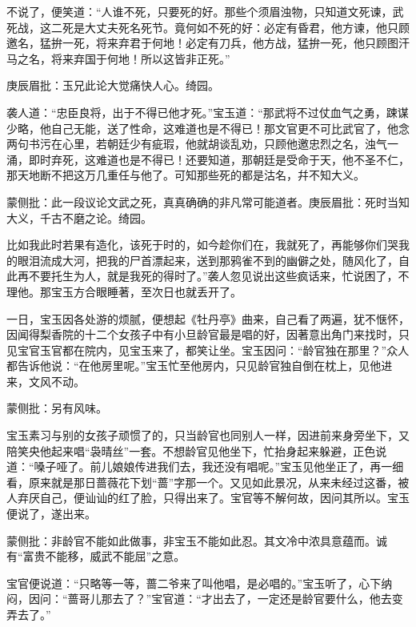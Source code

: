 \begin{parag}
不说了，便笑道：“人谁不死，只要死的好。那些个须眉浊物，只知道文死谏，武死战，这二死是大丈夫死名死节。竟何如不死的好：必定有昏君，他方谏，他只顾邀名，猛拚一死，将来弃君于何地！必定有刀兵，他方战，猛拚一死，他只顾图汗马之名，将来弃国于何地！所以这皆非正死。”\begin{note}庚辰眉批：玉兄此论大觉痛快人心。绮园。\end{note}袭人道：“忠臣良将，出于不得已他才死。”宝玉道：“那武将不过仗血气之勇，踈谋少略，他自己无能，送了性命，这难道也是不得已！那文官更不可比武官了，他念两句书污在心里，若朝廷少有疵瑕，他就胡谈乱劝，只顾他邀忠烈之名，浊气一涌，即时弃死，这难道也是不得已！还要知道，那朝廷是受命于天，他不圣不仁，那天地断不把这万几重任与他了。可知那些死的都是沽名，幷不知大义。\begin{note}蒙侧批：此一段议论文武之死，真真确确的非凡常可能道者。庚辰眉批：死时当知大义，千古不磨之论。绮园。\end{note}比如我此时若果有造化，该死于时的，如今趁你们在，我就死了，再能够你们哭我的眼泪流成大河，把我的尸首漂起来，送到那鸦雀不到的幽僻之处，随风化了，自此再不要托生为人，就是我死的得时了。”袭人忽见说出这些疯话来，忙说困了，不理他。那宝玉方合眼睡著，至次日也就丢开了。
\end{parag}


\begin{parag}


    一日，宝玉因各处游的烦腻，便想起《牡丹亭》曲来，自己看了两遍，犹不惬怀，因闻得梨香院的十二个女孩子中有小旦龄官最是唱的好，因著意出角门来找时，只见宝官玉官都在院内，见宝玉来了，都笑让坐。宝玉因问：“龄官独在那里？”众人都告诉他说：“在他房里呢。”宝玉忙至他房内，只见龄官独自倒在枕上，见他进来，文风不动。\begin{note}蒙侧批：另有风味。\end{note}宝玉素习与别的女孩子顽惯了的，只当龄官也同别人一样，因进前来身旁坐下，又陪笑央他起来唱“袅晴丝”一套。不想龄官见他坐下，忙抬身起来躲避，正色说道：“嗓子哑了。前儿娘娘传进我们去，我还没有唱呢。”宝玉见他坐正了，再一细看，原来就是那日蔷薇花下划“蔷”字那一个。又见如此景况，从来未经过这番，被人弃厌自己，便讪讪的红了脸，只得出来了。宝官等不解何故，因问其所以。宝玉便说了，遂出来。\begin{note}蒙侧批：非龄官不能如此做事，非宝玉不能如此忍。其文冷中浓具意蕴而。诚有“富贵不能移，威武不能屈”之意。\end{note}宝官便说道：“只略等一等，蔷二爷来了叫他唱，是必唱的。”宝玉听了，心下纳闷，因问：“蔷哥儿那去了？”宝官道：“才出去了，一定还是龄官要什么，他去变弄去了。”
\end{parag}


